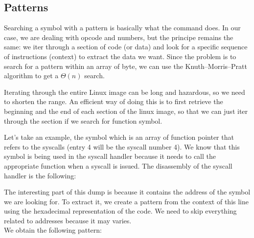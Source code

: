 \subsection{Patterns}
Searching a symbol with a pattern is basically what the  command
does. In our case, we are dealing with opcode and numbers, but the principe
remains the same: we iter through a section of code (or data) and look for
a specific sequence of instructions (context) to extract the data we want.
Since the problem is to search for a pattern within an array of byte, we can
use the Knuth–Morris–Pratt algorithm to get a $\Theta(n)$ search.

Iterating through the entire Linux image can be long and hazardous, so we need
to shorten the range. An efficient way of doing this is to first retrieve the
beginning and the end of each section of the linux image, so that we can just
iter through the  section if we search for function symbol.


Let's take an example, the  symbol which is an array of
function pointer that refers to the syscalls (entry 4 will be the syscall
number 4).
We know that this symbol is being used in the syscall handler because it needs
to call the appropriate function when a syscall is issued.
The disassembly of the syscall handler is the following:\\
\begin{bashcode}
$ gdb -batch -ex 'file ./vmlinux' -ex 'disassemble system_call_fastpath'}
Dump of assembler code for function system_call_fastpath:
   0xffffffff81872040 <+0>: cmp    $0x142,%
   0xffffffff81872046 <+6>: ja     0xffffffff81872057 <ret_from_sys_call>
   0xffffffff81872048 <+8>: mov    %
   0xffffffff8187204b <+11>:    callq  *-0x7e5ffd40(,%
   0xffffffff81872052 <+18>:    mov    %
End of assembler dump.
\end{bashcode}

The interesting part of this dump is 
because it contains the address of the symbol we are looking for.
To extract it, we create a pattern from the context of this line using the
hexadecimal representation of the code. We need to skip everything related to
addresses because it may varies.\\

We obtain the following pattern:\\

